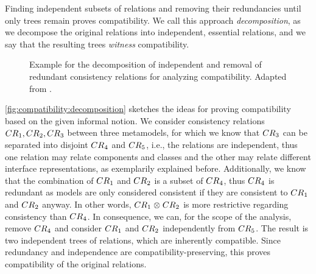 Finding independent subsets of relations and removing their redundancies until only trees remain proves compatibility.
We call this approach \emph{decomposition}, as we decompose the original relations into independent, essential relations, and we say that the resulting trees \emph{witness} compatibility.

\begin{figure}
    \centering
    
    \caption[Exemplary overview of compatibility analysis idea]{Example for the decomposition of independent and removal of redundant consistency relations for analyzing compatibility. Adapted from .}
    \label{fig:compatibility:decomposition}
\end{figure}

\autoref{fig:compatibility:decomposition} sketches the ideas for proving compatibility based on the given informal notion.
We consider consistency relations $\consistencyrelation{CR}{1}, \consistencyrelation{CR}{2}, \consistencyrelation{CR}{3}$ between three metamodels, for which we know that $\consistencyrelation{CR}{3}$ can be separated into disjoint $\consistencyrelation{CR}{4}$ and $\consistencyrelation{CR}{5}$, i.e., the relations are independent, thus one relation may relate components and classes and the other may relate different interface representations, as exemplarily explained before.
Additionally, we know that the combination of $\consistencyrelation{CR}{1}$ and $\consistencyrelation{CR}{2}$ is a subset of $\consistencyrelation{CR}{4}$, thus $\consistencyrelation{CR}{4}$ is redundant as models are only considered consistent if they are consistent to $\consistencyrelation{CR}{1}$ and $\consistencyrelation{CR}{2}$ anyway.
In other words, $\consistencyrelation{CR}{1} \concat \consistencyrelation{CR}{2}$ is more restrictive regarding consistency than $\consistencyrelation{CR}{4}$.
In consequence, we can, for the scope of the analysis, remove $\consistencyrelation{CR}{4}$ and consider $\consistencyrelation{CR}{1}$ and $\consistencyrelation{CR}{2}$ independently from $\consistencyrelation{CR}{5}$.
The result is two independent trees of relations, which are inherently compatible.
Since redundancy and independence are compatibility-preserving, this proves compatibility of the original relations.


